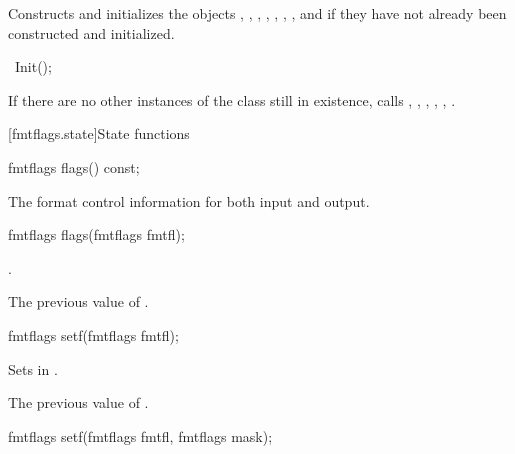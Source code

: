 \begin{itemdescr}
\pnum
\effects
Constructs and initializes the objects , , ,
, , , , and  if
they have not already been constructed and initialized.
\end{itemdescr}

%
\begin{itemdecl}
~Init();
\end{itemdecl}

\begin{itemdescr}
\pnum
\effects
If there are no other instances of the class still in existence,
calls
%
,
,
,
,
,
.
\end{itemdescr}

[fmtflags.state]{State functions}

%
\begin{itemdecl}
fmtflags flags() const;
\end{itemdecl}

\begin{itemdescr}
\pnum
\returns
The format control information for both input and output.
\end{itemdescr}

%
\begin{itemdecl}
fmtflags flags(fmtflags fmtfl);
\end{itemdecl}

\begin{itemdescr}
\pnum
\ensures
{}.

\pnum
\returns
The previous value of
.
\end{itemdescr}

%
\begin{itemdecl}
fmtflags setf(fmtflags fmtfl);
\end{itemdecl}

\begin{itemdescr}
\pnum
\effects
Sets  in
.

\pnum
\returns
The previous value of
.
\end{itemdescr}

%
\begin{itemdecl}
fmtflags setf(fmtflags fmtfl, fmtflags mask);
\end{itemdecl}


